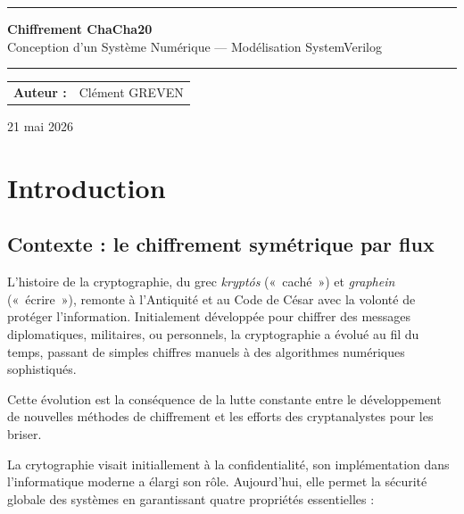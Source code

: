 \documentclass[12pt, a4paper]{article}
\begin{document}
\begin{titlepage}
  \centering
  \vspace{1.5cm}
  {\color{maincolor}\rule{\linewidth}{1.5pt}}
  \vspace{0.5cm}

  {\Huge\bfseries\color{maincolor} Chiffrement ChaCha20}\\[0.4cm]
  {\large Conception d'un Système Numérique --- Modélisation SystemVerilog}

  \vspace{0.4cm}
  {\color{maincolor}\rule{\linewidth}{1.5pt}}
  \vspace{3cm}

  \begin{tabular}{rl}
    \textbf{Auteur :}     & Clément GREVEN \\[8pt]
  \end{tabular}

  \vfill
  {\large 21 mai 2026}
\end{titlepage}

\tableofcontents\thispagestyle{empty}\clearpage

\section{Introduction}

\subsection{Contexte : le chiffrement symétrique par flux}

L'histoire de la cryptographie, du grec \textit{kryptós} («~caché~») et \textit{graphein}
(«~écrire~»), remonte à l'Antiquité et au Code de César avec la volonté de protéger
l'information. Initialement développée pour chiffrer des messages diplomatiques, militaires,
ou personnels, la cryptographie a évolué au fil du temps, passant de simples chiffres manuels
à des algorithmes numériques sophistiqués.

Cette évolution est la conséquence de la lutte constante entre le développement de nouvelles
méthodes de chiffrement et les efforts des cryptanalystes pour les briser.

La crytographie visait initiallement à la confidentialité, son implémentation dans
l'informatique moderne a élargi son rôle. Aujourd'hui, elle permet la sécurité globale des
systèmes en garantissant quatre propriétés essentielles :
\end{document}
